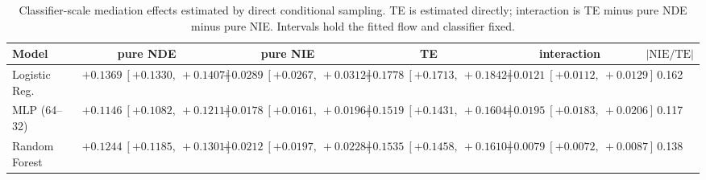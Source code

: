 \begin{table}[htbp]
  \centering
  \caption{Classifier-scale mediation effects estimated by direct conditional sampling. TE is estimated directly; interaction is TE minus pure NDE minus pure NIE. Intervals hold the fitted flow and classifier fixed.}
  \label{tab:adult_gap_overall}
  \begin{tabular}{lccccc}
    \toprule
    Model & pure NDE & pure NIE & TE & interaction & $|\mathrm{NIE}/\mathrm{TE}|$ \\
    \midrule
    Logistic Reg. & $+0.1369\ [+0.1330,\ +0.1407]$ & $+0.0289\ [+0.0267,\ +0.0312]$ & $+0.1778\ [+0.1713,\ +0.1842]$ & $+0.0121\ [+0.0112,\ +0.0129]$ & 0.162 \\
    MLP (64--32) & $+0.1146\ [+0.1082,\ +0.1211]$ & $+0.0178\ [+0.0161,\ +0.0196]$ & $+0.1519\ [+0.1431,\ +0.1604]$ & $+0.0195\ [+0.0183,\ +0.0206]$ & 0.117 \\
    Random Forest & $+0.1244\ [+0.1185,\ +0.1301]$ & $+0.0212\ [+0.0197,\ +0.0228]$ & $+0.1535\ [+0.1458,\ +0.1610]$ & $+0.0079\ [+0.0072,\ +0.0087]$ & 0.138 \\
    \bottomrule
  \end{tabular}
\end{table}